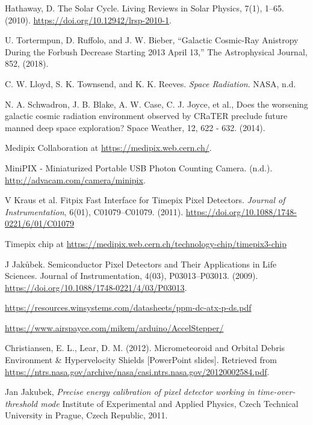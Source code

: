 \begin{thebibliography}{9}
  Hathaway, D. The Solar Cycle. Living Reviews in Solar Physics, 7(1), 1–65. (2010). \url{https://doi.org/10.12942/lrsp-2010-1}.

  U. Tortermpun, D. Ruffolo, and J. W. Bieber, “Galactic Cosmic-Ray Anistropy During the Forbush Decrease Starting 2013 April 13,” The Astrophysical Journal, 852, (2018).

  C. W. Lloyd, S. K. Townsend, and K. K. Reeves. \textit{Space Radiation}. NASA, n.d.

  N. A. Schwadron, J. B. Blake, A. W. Case, C. J. Joyce, et al., Does the worsening galactic cosmic radiation environment observed by CRaTER preclude future manned deep space exploration? Space Weather, 12, 622 - 632. (2014).

  Medipix Collaboration at \url{https://medipix.web.cern.ch/}.

  MiniPIX - Miniaturized Portable USB Photon Counting Camera. (n.d.). \url{http://advacam.com/camera/minipix}.

  V Kraus et al. Fitpix Fast Interface for Timepix Pixel Detectors. \textit{Journal of Instrumentation}, 6(01), C01079–C01079. (2011). \url{https://doi.org/10.1088/1748-0221/6/01/C01079}

  Timepix chip at \url{https://medipix.web.cern.ch/technology-chip/timepix3-chip}

  J Jakůbek. Semiconductor Pixel Detectors and Their Applications in Life Sciences. Journal of Instrumentation, 4(03), P03013–P03013. (2009). \url{https://doi.org/10.1088/1748-0221/4/03/P03013}.

\url{https://resources.winsystems.com/datasheets/ppm-dc-atx-p-ds.pdf}

\url{https://www.airspayce.com/mikem/arduino/AccelStepper/}

  Christiansen, E. L., Lear, D. M. (2012). Micrometeoroid and Orbital Debris Environment \& Hypervelocity Shields [PowerPoint slides]. Retrieved from \url{https://ntrs.nasa.gov/archive/nasa/casi.ntrs.nasa.gov/20120002584.pdf}.

  Jan Jakubek, \textit{Precise energy calibration of pixel detector working in time-over-threshold mode} Institute of Experimental and Applied Physics, Czech Technical University in Prague, Czech Republic, 2011.


\end{thebibliography}
